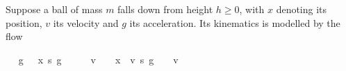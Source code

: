 \documentclass[envcountsame,envcountsect]{llncs}
\begin{document}
\begin{example}\label{ex:ball-hoare}
  Suppose a ball of mass $m$ falls down from height $h\geq 0$, with
  $x$ denoting its position, $v$ its velocity and $g$ its
  acceleration. Its kinematics is modelled by the flow
\begin{isabellebody}
\isanewline
{}\ %
{\isachardoublequoteopen}{\isasymphi}\ g\ {\isasymtau}\ {\isasymequiv}\ {\isacharbrackleft}x\ {\isasymmapsto}\isactrlsub s\ g\ {\isasymcdot}\ {\isasymtau}\ {\isacharcircum}\ {}{\isacharslash}{}\ {\isacharplus}\ v\ {\isasymcdot}\ {\isasymtau}\ {\isacharplus}\ x{\isacharcomma}\ \ v\ {\isasymmapsto}\isactrlsub s\ g\ {\isasymcdot}\ {\isasymtau}\ {\isacharplus}\ v{\isacharbrackright}{\isachardoublequoteclose}\isanewline
\end{isabellebody}


\end{example}
\end{document}
